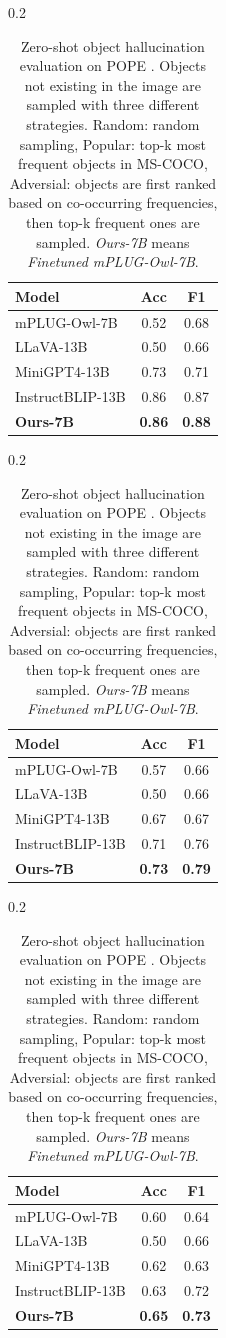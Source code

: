 \vspace{-0.1in}
\begin{table}[t]
\begin{subtable}[t]{0.2\textwidth}
\small
\begin{tabular}{lcc}
\toprule[1.5pt]
Model & Acc & F1\\
\midrule
mPLUG-Owl-7B & 0.52 & 0.68 \\
LLaVA-13B & 0.50 & 0.66 \\
MiniGPT4-13B & 0.73 & 0.71\\
InstructBLIP-13B & 0.86 & 0.87 \\
\textbf{Ours-7B} & \textbf{0.86} & \textbf{0.88} \\
\bottomrule[1.5pt]
\end{tabular}
 \caption{Random Set.}
\label{tab:stat1}
\end{subtable}
\hspace{0.8in}
\begin{subtable}[t]{0.2\textwidth}
\setlength\tabcolsep{4.7pt}
\centering
\small
\begin{tabular}{lcc}
\toprule[1.5pt]
Model & Acc & F1\\
\midrule
mPLUG-Owl-7B & 0.57 & 0.66 \\
LLaVA-13B & 0.50 & 0.66 \\
MiniGPT4-13B & 0.67 & 0.67\\
InstructBLIP-13B & 0.71 & 0.76 \\
\textbf{Ours-7B} & \textbf{0.73} & \textbf{0.79} \\
\bottomrule[1.5pt]
\end{tabular}
\caption{
Popular Set.}
\label{tab:stat2}
\end{subtable}
\hspace{0.7in}
\begin{subtable}[t]{0.2\textwidth}
\setlength\tabcolsep{4.7pt}
\centering
\small
\begin{tabular}{lcc}
\toprule[1.5pt]
Model & Acc & F1\\
\midrule
mPLUG-Owl-7B & 0.60 & 0.64 \\
LLaVA-13B & 0.50 & 0.66 \\
MiniGPT4-13B & 0.62 & 0.63\\
InstructBLIP-13B & 0.63 & 0.72 \\
\textbf{Ours-7B} & \textbf{0.65} & \textbf{0.73} \\
\bottomrule[1.5pt]
\end{tabular}
\caption{Adversarial Set.}
\label{tab:stat2}
\end{subtable}
\vspace{2mm}
\caption{Zero-shot object hallucination evaluation on POPE \citep{li2023evaluating}. Objects not existing in the image are sampled with three different strategies. Random: random sampling, Popular: top-k most frequent objects in MS-COCO, Adversial: objects are first ranked based on co-occurring frequencies, then top-k frequent ones are sampled. \textit{Ours-7B} means \textit{Finetuned mPLUG-Owl-7B}.
}
\label{tab:pope}
\vspace{-0.2in}
\end{table}



